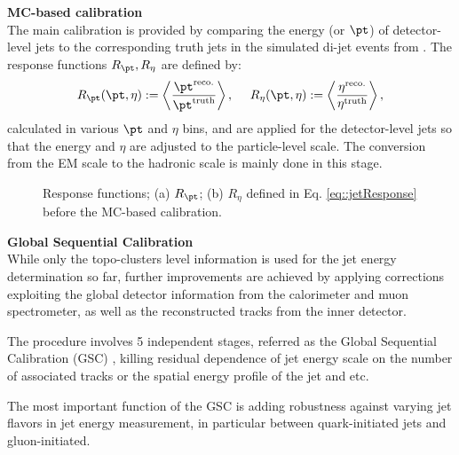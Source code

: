 \begin{description}
\item \textbf{MC-based calibration} \\
The main calibration is provided by comparing the energy (or $\pt$) of detector-level jets to the corresponding truth jets in the simulated di-jet events from \pythia. The response functions $R_{\pt}, R_\eta$ are defined by:
\begin{align}
R_{\pt} (\pt,\eta) := \left< \frac{\pt^{\mathrm{reco.}}}{\pt^{\mathrm{truth}}} \right>, \,\,\,\,\,\,\,\,
R_\eta  (\pt,\eta) := \left< \frac{\eta^{\mathrm{reco.}}}{\eta^{\mathrm{truth}}} \right>, 
\label{eq::jetResponse}
\end{align}
calculated in various $\pt$ and $\eta$ bins, 
and are applied for the detector-level jets so that the energy and $\eta$ are adjusted to the particle-level scale. The conversion from the EM scale to the hadronic scale is mainly done in this stage.
\begin{figure}
  \centering
    \caption{ Response functions; (a) $R_{\pt}$; (b) $R_\eta$ defined in Eq. \ref{eq::jetResponse} before the MC-based calibration. \cite{144_JESmeas_2015data}
      \label{fig::objDef::jetResponse} }
\end{figure}





\item \textbf{Global Sequential Calibration} \\
While only the topo-clusters level information is used for the jet energy determination so far, 
further improvements are achieved by applying corrections exploiting the global detector information from the calorimeter and muon spectrometer, as well as the reconstructed tracks from the inner detector. 

The procedure involves 5 independent stages, referred as the Global Sequential Calibration (GSC) \cite{140_jetEneMeas_TCcalib}, killing residual dependence of jet energy scale on the number of associated tracks or the spatial energy profile of the jet and etc. 

The most important function of the GSC is adding robustness against varying jet flavors in jet energy measurement, in particular between quark-initiated jets and gluon-initiated.







\end{description}
